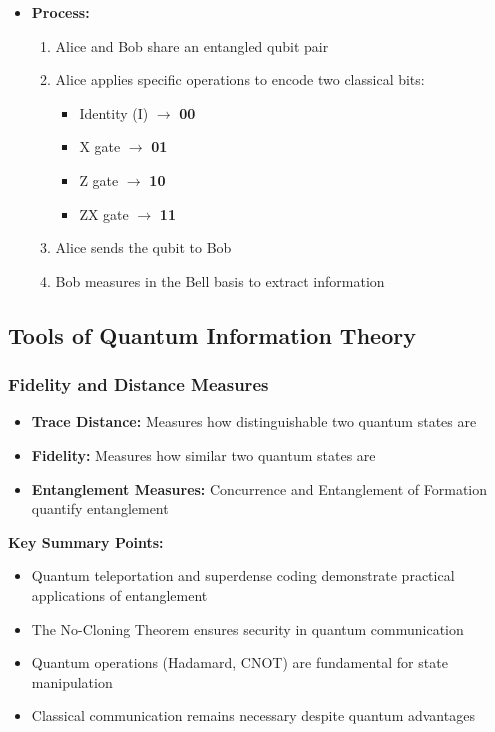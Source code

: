 \documentclass{article}
\begin{document}
\begin{itemize}
    \item \textbf{Process:}
    \begin{enumerate}
        \item Alice and Bob share an entangled qubit pair
        \item Alice applies specific operations to encode two classical bits:
        \begin{itemize}
            \item Identity (I) \(\rightarrow\) \textbf{00}
            \item X gate \(\rightarrow\) \textbf{01}
            \item Z gate \(\rightarrow\) \textbf{10}
            \item ZX gate \(\rightarrow\) \textbf{11}
        \end{itemize}
        \item Alice sends the qubit to Bob
        \item Bob measures in the Bell basis to extract information
    \end{enumerate}
\end{itemize}

\subsection{Tools of Quantum Information Theory}
\subsubsection{Fidelity and Distance Measures}
\begin{itemize}
    \item \textbf{Trace Distance:} Measures how distinguishable two quantum states are
    \item \textbf{Fidelity:} Measures how similar two quantum states are
    \item \textbf{Entanglement Measures:} Concurrence and Entanglement of Formation quantify entanglement
\end{itemize}

\begin{conceptbox}
\textbf{Key Summary Points:}
\begin{itemize}
    \item Quantum teleportation and superdense coding demonstrate practical applications of entanglement
    \item The No-Cloning Theorem ensures security in quantum communication
    \item Quantum operations (Hadamard, CNOT) are fundamental for state manipulation
    \item Classical communication remains necessary despite quantum advantages
\end{itemize}
\end{conceptbox}
\end{document}
